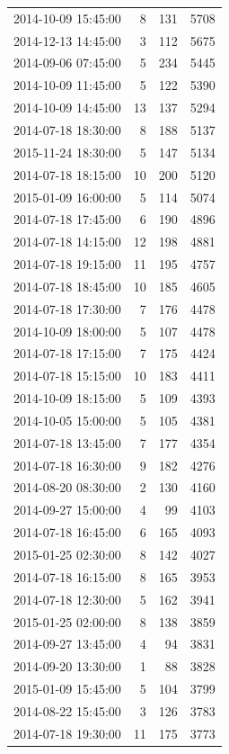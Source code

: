 \begin{tabular}{lrrr}
2014-10-09 15:45:00 & 8 & 131 & 5708 \\
2014-12-13 14:45:00 & 3 & 112 & 5675 \\
2014-09-06 07:45:00 & 5 & 234 & 5445 \\
2014-10-09 11:45:00 & 5 & 122 & 5390 \\
2014-10-09 14:45:00 & 13 & 137 & 5294 \\
2014-07-18 18:30:00 & 8 & 188 & 5137 \\
2015-11-24 18:30:00 & 5 & 147 & 5134 \\
2014-07-18 18:15:00 & 10 & 200 & 5120 \\
2015-01-09 16:00:00 & 5 & 114 & 5074 \\
2014-07-18 17:45:00 & 6 & 190 & 4896 \\
2014-07-18 14:15:00 & 12 & 198 & 4881 \\
2014-07-18 19:15:00 & 11 & 195 & 4757 \\
2014-07-18 18:45:00 & 10 & 185 & 4605 \\
2014-07-18 17:30:00 & 7 & 176 & 4478 \\
2014-10-09 18:00:00 & 5 & 107 & 4478 \\
2014-07-18 17:15:00 & 7 & 175 & 4424 \\
2014-07-18 15:15:00 & 10 & 183 & 4411 \\
2014-10-09 18:15:00 & 5 & 109 & 4393 \\
2014-10-05 15:00:00 & 5 & 105 & 4381 \\
2014-07-18 13:45:00 & 7 & 177 & 4354 \\
2014-07-18 16:30:00 & 9 & 182 & 4276 \\
2014-08-20 08:30:00 & 2 & 130 & 4160 \\
2014-09-27 15:00:00 & 4 & 99 & 4103 \\
2014-07-18 16:45:00 & 6 & 165 & 4093 \\
2015-01-25 02:30:00 & 8 & 142 & 4027 \\
2014-07-18 16:15:00 & 8 & 165 & 3953 \\
2014-07-18 12:30:00 & 5 & 162 & 3941 \\
2015-01-25 02:00:00 & 8 & 138 & 3859 \\
2014-09-27 13:45:00 & 4 & 94 & 3831 \\
2014-09-20 13:30:00 & 1 & 88 & 3828 \\
2015-01-09 15:45:00 & 5 & 104 & 3799 \\
2014-08-22 15:45:00 & 3 & 126 & 3783 \\
2014-07-18 19:30:00 & 11 & 175 & 3773 \\

\end{tabular}
